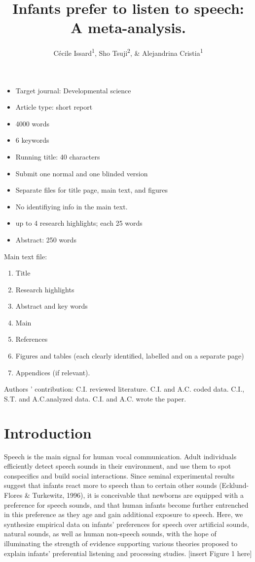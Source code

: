 \documentclass[]{apa6}
\title{Infants prefer to listen to speech: A meta-analysis.}
\author{Cécile Issard\textsuperscript{1}, Sho Tsuji\textsuperscript{2}, \& Alejandrina Cristia\textsuperscript{1}}
\affiliation{
    \vspace{0.5cm}
          \textsuperscript{1} Laboratoire de Sciences Cognitives et Psycholinguistique, Ecole Normale
Supérieure, Département d'Études Cognitives\\
          \textsuperscript{2} International Research Center for Neurointelligence, The University of
Tokyo  }
\providecommand{\tightlist}{%
  \setlength{\itemsep}{0pt}\setlength{\parskip}{0pt}}
\begin{document}
\maketitle

\setcounter{secnumdepth}{0}



\begin{itemize}
\tightlist
\item
  Target journal: Developmental science
\item
  Article type: short report
\item
  4000 words
\item
  6 keywords
\item
  Running title: 40 characters
\item
  Submit one normal and one blinded version
\item
  Separate files for title page, main text, and figures
\item
  No identifiying info in the main text.
\item
  up to 4 research highlights; each 25 words
\item
  Abstract: 250 words
\end{itemize}

Main text file:

\begin{enumerate}
\def\labelenumi{\arabic{enumi}.}
\tightlist
\item
  Title
\item
  Research highlights
\item
  Abstract and key words
\item
  Main
\item
  References
\item
  Figures and tables (each clearly identified, labelled and on a
  separate page)
\item
  Appendices (if relevant).
\end{enumerate}

Authors ' contribution: C.I. reviewed literature. C.I. and A.C. coded
data. C.I., S.T. and A.C.analyzed data. C.I. and A.C. wrote the paper.

\section{Introduction}\label{introduction}

Speech is the main signal for human vocal communication. Adult
individuals efficiently detect speech sounds in their environment, and
use them to spot conspecifics and build social interactions. Since
seminal experimental results suggest that infants react more to speech
than to certain other sounds (Ecklund-Flores \& Turkewitz, 1996), it is
conceivable that newborns are equipped with a preference for speech
sounds, and that human infants become further entrenched in this
preference as they age and gain additional exposure to speech. Here, we
synthesize empirical data on infants' preferences for speech over
artificial sounds, natural sounds, as well as human non-speech sounds,
with the hope of illuminating the strength of evidence supporting
various theories proposed to explain infants' preferential listening and
processing studies. {[}insert Figure 1 here{]}
\end{document}
